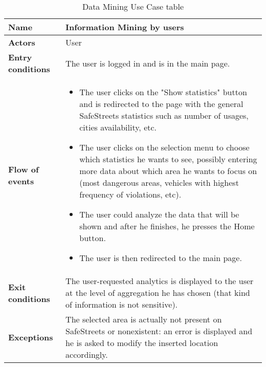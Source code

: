 \begin{table}[!htbp]
	\centering
	\begin{tabular}{lp{9cm}}
\bf\large Name&\bf\large Information Mining by users\\
\hline
\hline
\bf Actors&User\\
\hline
\bf Entry conditions&The user is logged in and is in the main page.\\
\hline
\bf Flow of events&
\begin{itemize}

\item The user clicks on the "Show statistics" button and is redirected to the page with the general SafeStreets statistics such as number of usages, cities availability, etc.

\item The user clicks on the selection menu to choose which statistics he wants to see, possibly entering more data about which area he wants to focus on (most dangerous areas, vehicles with highest frequency of violations, etc).

\item The user could analyze the data that will be shown and after he finishes, he presses the Home button.

\item The user is then redirected to the main page.

\end{itemize}
\\
\hline
\bf Exit conditions&The user-requested analytics is displayed to the user at the level of aggregation he has chosen (that kind of information is not sensitive).\\
\hline
\bf Exceptions&The selected area is actually not present on SafeStreets or nonexistent: an error is displayed and he is asked to modify the inserted location accordingly.
\\
\hline

\end{tabular}
\caption{Data Mining Use Case table}
 \label{tab:dataminingtab}
\end{table}